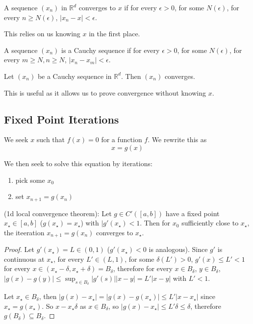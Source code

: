 \begin{definition}
	A sequence $(x_n)$ in $\mathbb{R}^d$ converges to $x$ if for every $\epsilon > 0$, for some $N(\epsilon)$, for every $n \ge N(\epsilon)$, $|x_n - x| < \epsilon$.

	This relies on us knowing $x$ in the first place.
\end{definition}

\begin{definition}
	A sequence $(x_n)$ is a Cauchy sequence if for every $\epsilon > 0$, for some $N(\epsilon)$, for every $m \ge N, n \ge N$, $|x_n - x_m| < \epsilon$.
\end{definition}


\begin{theorem}
	Let $(x_n)$ be a Cauchy sequence in $\mathbb{R}^d$. Then $(x_n)$ converges.
\end{theorem}

This is useful as it allows us to prove convergence without knowing $x$.

\subsection{Fixed Point Iterations}

We seek $x$ such that $f(x) = 0$ for a function $f$. We rewrite this as \[x = g(x)\]

We then seek to solve this equation by iterations:

\begin{enumerate}
	\item pick some $x_0$
	\item set $x_{n + 1} = g(x_n)$
\end{enumerate}

\begin{theorem}
	(1d local convergence theorem): Let $g \in C'([a, b])$ have a fixed point $x_{\star} \in [a, b]$ ($g(x_{\star}) = x_{\star}$) with $|g'(x_{\star}) < 1$. Then for $x_0$ sufficiently close to $x_{\star}$, the iteeration $x_{n + 1} = g(x_n)$ converges to $x_{\star}$.
\end{theorem}

\begin{proof}
	Let $g'(x_{\star}) = L \in (0, 1)$ ($g'(x_{\star}) < 0$ is analogous). Since $g'$ is continuous at $x_{\star}$, for every $L' \in (L, 1)$, for some $\delta(L') > 0$, $g'(x) \le L' < 1$ for every $x \in (x_{\star} - \delta, x_{\star} + \delta) = B_{\delta}$, therefore for every $x \in B_{\delta}$, $y \in B_{\delta}$, $|g(x) - g(y)| \le \sup_{s \in B_{\delta}} |g'(s)| |x - y| = L' |x - y|$ with $L' < 1$.

	Let $x_{\star} \in B_{\delta}$, then $|g(x) - x_{\star}| = |g(x) - g(x_{\star})| \le L' |x - x_{\star}|$ since $x_{\star} = g(x_{\star})$. So $x - x_{\star} \delta$ as $x \in B_{\delta}$, so $|g(x) - x_{\star}| \le L'\delta \le \delta$, therefore $g(B_\delta) \subseteq B_{\delta}$.
\end{proof}

